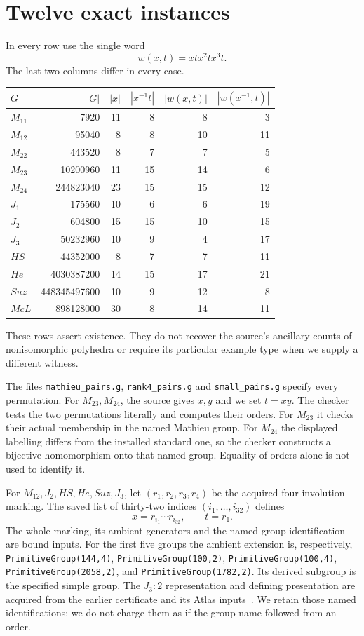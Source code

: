 \documentclass[11pt,a4paper]{article}
\begin{document}
\section{Twelve exact instances}
In every row use the single word
\[
 w(x,t)=x t x^2 t x^3 t.
\]
The last two columns differ in every case.
\begin{center}
\begin{tabular}{lrrrrr}\toprule
$G$&$|G|$&$|x|$&$|x^{-1}t|$&$|w(x,t)|$&$|w(x^{-1},t)|$\\\midrule
$M_{11}$&7920&11&8&8&3\\
$M_{12}$&95040&8&8&10&11\\
$M_{22}$&443520&8&7&7&5\\
$M_{23}$&10200960&11&15&14&6\\
$M_{24}$&244823040&23&15&15&12\\
$J_1$&175560&10&6&6&19\\
$J_2$&604800&15&15&10&15\\
$J_3$&50232960&10&9&4&17\\
$HS$&44352000&8&7&7&11\\
$He$&4030387200&14&15&17&21\\
$Suz$&448345497600&10&9&12&8\\
$McL$&898128000&30&8&14&11\\\bottomrule
\end{tabular}
\end{center}
These rows assert existence. They do not recover the source's ancillary
counts of nonisomorphic polyhedra or require its particular example type
when we supply a different witness.

The files \texttt{mathieu\_pairs.g}, \texttt{rank4\_pairs.g} and
\texttt{small\_pairs.g} specify every permutation. For $M_{23},M_{24}$,
the source gives $x,y$ and we set $t=xy$. The checker tests the two
permutations literally and computes their orders. For $M_{23}$ it
checks their actual membership in the named Mathieu group. For
$M_{24}$ the displayed labelling differs from the installed standard
one, so the checker constructs a bijective homomorphism onto that
named group. Equality of orders alone is not used to identify it.

For $M_{12},J_2,HS,He,Suz,J_3$, let $(r_1,r_2,r_3,r_4)$ be the acquired
four-involution marking. The saved list of thirty-two indices
$(i_1,\ldots,i_{32})$ defines
\[
          x=r_{i_1}\cdots r_{i_{32}},\qquad t=r_1.
\]
The whole marking, its ambient generators and the named-group
identification are bound inputs. For the first five groups the
ambient extension is, respectively,
\texttt{PrimitiveGroup(144,4)}, \texttt{PrimitiveGroup(100,2)},
\texttt{PrimitiveGroup(100,4)}, \texttt{PrimitiveGroup(2058,2)},
and \texttt{PrimitiveGroup(1782,2)}. Its derived subgroup is the
specified simple group. The $J_3:2$ representation and defining
presentation are acquired from the earlier certificate and its
Atlas inputs~\cite{Atlas}. We retain those named identifications;
we do not charge them as if the group name followed from an order.
\end{document}
